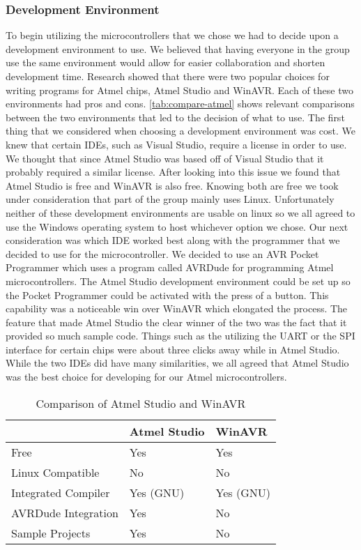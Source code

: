 \subsubsection{Development Environment}
To begin utilizing the microcontrollers that we chose we had to decide upon a
development environment to use. We believed that having everyone in the group
use the same environment would allow for easier collaboration and shorten
development time. Research showed that there were two popular choices for
writing programs for Atmel chips, Atmel Studio and WinAVR. Each of these two
environments had pros and cons. \autoref{tab:compare-atmel} shows relevant comparisons
between the two environments that led to the decision of what to use. The first
thing that we considered when choosing a development environment was cost. We
knew that certain IDEs, such as Visual Studio, require a license in order to
use. We thought that since Atmel Studio was based off of Visual Studio that it
probably required a similar license.  After looking into this issue we found
that Atmel Studio is free and WinAVR is also free. Knowing both are free we
took under consideration that part of the group mainly uses Linux.
Unfortunately neither of these development environments are usable on linux so
we all agreed to use the Windows operating system to host whichever option we
chose. Our next consideration was which IDE worked best along with the
programmer that we decided to use for the microcontroller. We decided to use an
AVR Pocket Programmer which uses a program called AVRDude for programming Atmel
microcontrollers. The Atmel Studio development environment could be set up so
the Pocket Programmer could be activated with the press of a button. This
capability was a noticeable win over WinAVR which elongated the process. The
feature that made Atmel Studio the clear winner of the two was the fact that it
provided so much sample code. Things such as the utilizing the UART or the SPI
interface for certain chips were about three clicks away while in Atmel Studio.
While the two IDEs did have many similarities, we all agreed that Atmel Studio
was the best choice for developing for our Atmel microcontrollers.

\begin{table}[H]
\centering
\begin{tabular}{|l|l|l|}
\hline
 &
{\color{black} Atmel Studio} &
{\color{black} WinAVR}\\\hline
{\color{black} Free} &
{\color{black} Yes} &
{\color{black} Yes}\\\hline
{\color{black} Linux Compatible} &
{\color{black} No} &
{\color{black} No}\\\hline
{\color{black} Integrated Compiler} &
{\color{black} Yes (GNU)} &
{\color{black} Yes (GNU)}\\\hline
{\color{black} AVRDude Integration} &
{\color{black} Yes} &
{\color{black} No}\\\hline
{\color{black} Sample Projects} &
{\color{black} Yes} &
{\color{black} No}\\\hline
\end{tabular}
\caption{Comparison of Atmel Studio and WinAVR}
\label{tab:compare-atmel}
\end{table}

